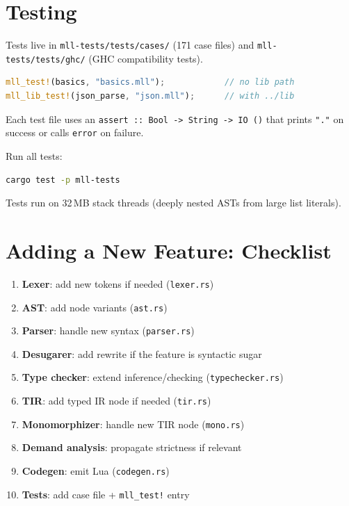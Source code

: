 \documentclass[11pt,a4paper]{article}
\begin{document}
\section{Testing}

Tests live in \texttt{mll-tests/tests/cases/} (171 case files) and
\texttt{mll-tests/tests/ghc/} (GHC compatibility tests).

\begin{lstlisting}[language=Rust]
mll_test!(basics, "basics.mll");            // no lib path
mll_lib_test!(json_parse, "json.mll");      // with ../lib
\end{lstlisting}

Each test file uses an \texttt{assert :: Bool -> String -> IO ()} that prints
\texttt{"."} on success or calls \texttt{error} on failure.

Run all tests:
\begin{lstlisting}[language=bash]
cargo test -p mll-tests
\end{lstlisting}

Tests run on 32\,MB stack threads (deeply nested ASTs from large list literals).

\section{Adding a New Feature: Checklist}

\begin{enumerate}[nosep]
  \item \textbf{Lexer}: add new tokens if needed (\texttt{lexer.rs})
  \item \textbf{AST}: add node variants (\texttt{ast.rs})
  \item \textbf{Parser}: handle new syntax (\texttt{parser.rs})
  \item \textbf{Desugarer}: add rewrite if the feature is syntactic sugar
  \item \textbf{Type checker}: extend inference/checking (\texttt{typechecker.rs})
  \item \textbf{TIR}: add typed IR node if needed (\texttt{tir.rs})
  \item \textbf{Monomorphizer}: handle new TIR node (\texttt{mono.rs})
  \item \textbf{Demand analysis}: propagate strictness if relevant
  \item \textbf{Codegen}: emit Lua (\texttt{codegen.rs})
  \item \textbf{Tests}: add case file + \texttt{mll\_test!} entry
\end{enumerate}
\end{document}
